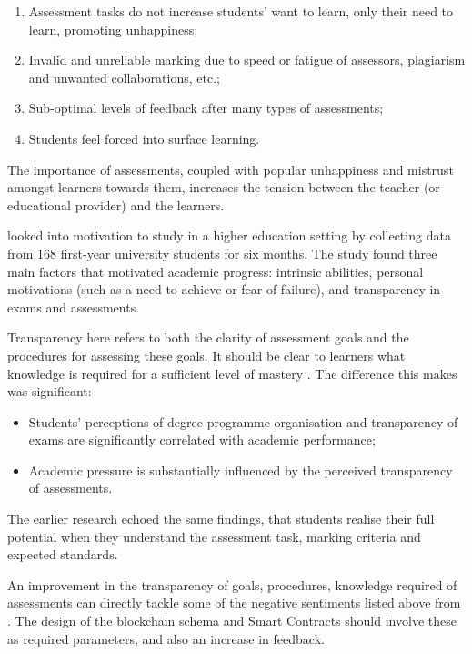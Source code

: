 \begin{enumerate}
	\setlength\itemsep{0em}
	\item Assessment tasks do not increase students' want to learn, only their need to learn, promoting unhappiness;
	\item Invalid and unreliable marking due to speed or fatigue of assessors, plagiarism and unwanted collaborations, etc.;
	\item Sub-optimal levels of feedback after many types of assessments;
	\item Students feel forced into surface learning.
\end{enumerate}

The importance of assessments, coupled with popular unhappiness and mistrust amongst learners towards
them, increases the tension between the teacher (or educational provider) and the learners.

\citet{suhre2013determinants} looked into motivation to study in a higher education setting by collecting data
from 168 first-year university students for six months. The study found three main factors that motivated academic
progress: intrinsic abilities, personal motivations (such as a need to achieve or fear of failure), 
and transparency in exams and assessments.

Transparency here refers to both the clarity of assessment goals and the procedures for assessing these goals.
It should be clear to learners what knowledge is required for a sufficient level of mastery \citep{suhre2013determinants}.
The difference this makes was significant:

\begin{itemize}
	\setlength\itemsep{0em}
	\item Students' perceptions of degree programme organisation and transparency of exams are
	      significantly correlated with academic performance;
	\item Academic pressure is substantially influenced by the perceived transparency of assessments.
\end{itemize}

The earlier \citet[p.100]{bryan2006innovative} research echoed the same findings, that students realise their full potential
when they understand the assessment task, marking criteria and expected standards.

An improvement in the transparency of goals, procedures, knowledge required of assessments 
can directly tackle some of the negative sentiments listed above from \citet{brown1999assessment}. 
The design of the blockchain schema and Smart Contracts should involve these as required parameters, and also an increase
in feedback.

